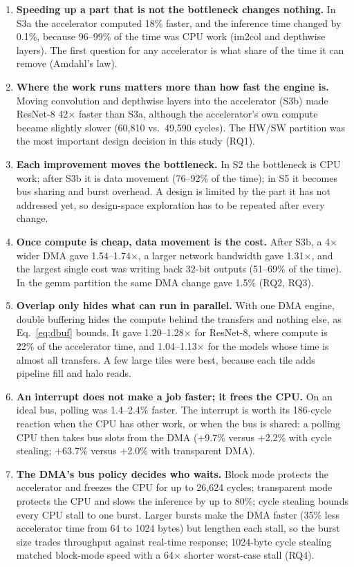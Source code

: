 \documentclass[conference]{IEEEtran}
\begin{document}
\begin{enumerate}
\item \textbf{Speeding up a part that is not the bottleneck changes nothing.} In S3a the accelerator computed 18\% faster, and the inference time changed by 0.1\%, because 96--99\% of the time was CPU work (im2col and depthwise layers). The first question for any accelerator is what share of the time it can remove (Amdahl's law).
\item \textbf{Where the work runs matters more than how fast the engine is.} Moving convolution and depthwise layers into the accelerator (S3b) made ResNet-8 42$\times$ faster than S3a, although the accelerator's own compute became slightly slower (60{,}810 vs.\ 49{,}590 cycles). The HW/SW partition was the most important design decision in this study (RQ1).
\item \textbf{Each improvement moves the bottleneck.} In S2 the bottleneck is CPU work; after S3b it is data movement (76--92\% of the time); in S5 it becomes bus sharing and burst overhead. A design is limited by the part it has not addressed yet, so design-space exploration has to be repeated after every change.
\item \textbf{Once compute is cheap, data movement is the cost.} After S3b, a 4$\times$ wider DMA gave 1.54--1.74$\times$, a larger network bandwidth gave 1.31$\times$, and the largest single cost was writing back 32-bit outputs (51--69\% of the time). In the gemm partition the same DMA change gave 1.5\% (RQ2, RQ3).
\item \textbf{Overlap only hides what can run in parallel.} With one DMA engine, double buffering hides the compute behind the transfers and nothing else, as Eq.~\eqref{eq:dbuf} bounds. It gave 1.20--1.28$\times$ for ResNet-8, where compute is 22\% of the accelerator time, and 1.04--1.13$\times$ for the models whose time is almost all transfers. A few large tiles were best, because each tile adds pipeline fill and halo reads.
\item \textbf{An interrupt does not make a job faster; it frees the CPU.} On an ideal bus, polling was 1.4--2.4\% faster. The interrupt is worth its 186-cycle reaction when the CPU has other work, or when the bus is shared: a polling CPU then takes bus slots from the DMA (+9.7\% versus +2.2\% with cycle stealing; +63.7\% versus +2.0\% with transparent DMA).
\item \textbf{The DMA's bus policy decides who waits.} Block mode protects the accelerator and freezes the CPU for up to 26{,}624 cycles; transparent mode protects the CPU and slows the inference by up to 80\%; cycle stealing bounds every CPU stall to one burst. Larger bursts make the DMA faster (35\% less accelerator time from 64 to 1024 bytes) but lengthen each stall, so the burst size trades throughput against real-time response; 1024-byte cycle stealing matched block-mode speed with a 64$\times$ shorter worst-case stall (RQ4).
\end{enumerate}
\end{document}
